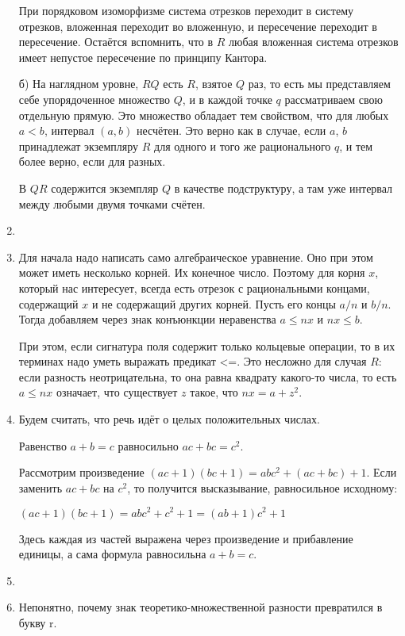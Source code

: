 \documentclass[11pt]{article}
\begin{document}
\begin{enumerate}
		При порядковом изоморфизме система отрезков переходит в систему отрезков, вложенная переходит во вложенную, и пересечение переходит в пересечение. Остаётся вспомнить, что в $R$ любая вложенная система отрезков имеет непустое пересечение по принципу Кантора.
		
		б) На наглядном уровне, $RQ$ есть $R$, взятое $Q$ раз, то есть мы представляем себе упорядоченное множество $Q$, и в каждой точке $q$ рассматриваем свою отдельную прямую. Это множество обладает тем свойством, что для любых $a < b$, интервал $(a,b)$ несчётен. Это верно как в случае, если $a$, $b$ принадлежат экземпляру $R$ для одного и того же рационального $q$, и тем более верно, если для разных.
		
		В $QR$ содержится экземпляр $Q$ в качестве подструктуру, а там уже интервал между любыми двумя точками счётен.
		
		\item 
		\item Для начала надо написать само алгебраическое уравнение. Оно при этом может иметь несколько корней. Их конечное число. Поэтому для корня $x$, который нас интересует, всегда есть отрезок с рациональными концами, содержащий $x$ и не содержащий других корней. Пусть его концы $a/n$ и $b/n$. Тогда добавляем через знак конъюнкции неравенства $a\le nx$ и $nx\le b$.
		
		При этом, если сигнатура поля содержит только кольцевые операции, то в их терминах надо уметь выражать предикат <=. Это несложно для случая $R$: если разность неотрицательна, то она равна квадрату какого-то числа, то есть $a\le nx$ означает, что существует $z$ такое, что $nx=a+z^2$.
		
		\item  
		
		Будем считать, что речь идёт о целых положительных числах.
		
		Равенство $a+b=c$ равносильно $ac+bc=c^2$.
		
		Рассмотрим произведение $(ac+1)(bc+1)=abc^2+(ac+bc)+1$. Если заменить $ac+bc$ на $c^2$, то получится высказывание, равносильное исходному:
		
		$(ac+1)(bc+1)=abc^2+c^2+1=(ab+1)c^2+1$
		
		Здесь каждая из частей выражена через произведение и прибавление единицы, а сама формула равносильна $a+b=c$.
		
		\item 
		\item 
		
		Непонятно, почему знак теоретико-множественной разности превратился в букву r.
		

\end{enumerate}
\end{document}
